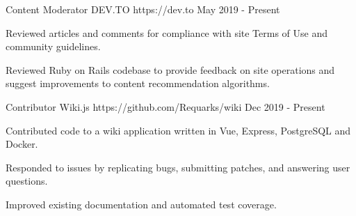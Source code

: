 

\begin{cventries}

  \cventry
    {Content Moderator} %
    {DEV.TO} %
    {https://dev.to} %
    {May 2019 - Present} %
    {
      \begin{cvitems} %
        \item {Reviewed articles and comments for compliance with site Terms of Use and community guidelines.}
        \item {Reviewed Ruby on Rails codebase to provide feedback on site operations and suggest improvements to content recommendation algorithms.}
      \end{cvitems}
    }

  \cventry
    {Contributor} %
    {Wiki.js} %
    {https://github.com/Requarks/wiki} %
    {Dec 2019 - Present} %
    {
      \begin{cvitems} %
        \item {Contributed code to a wiki application written in Vue, Express, PostgreSQL and Docker.}
        \item {Responded to issues by replicating bugs, submitting patches, and answering user questions.}
        \item {Improved existing documentation and automated test coverage.}
      \end{cvitems}
    }


\end{cventries}
